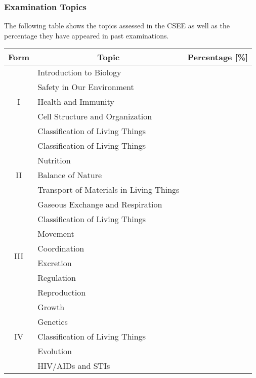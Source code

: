 \subsubsection{Examination Topics}
\noindent The following table shows the topics assessed in the CSEE as well as the percentage they have appeared in past examinations. 
\begin{center}
	\begin{tabular}{|c|l|c|} \hline
		Form & \multicolumn{1}{|c|}{Topic} & Percentage [\%] \\ \hline
		\multirow{5}{*}{I} 	& Introduction to Biology					& \\ \cline{2-3}
						& Safety in Our Environment				& \\ \cline{2-3}
						& Health and Immunity					& \\ \cline{2-3}
						& Cell Structure and Organization			& \\ \cline{2-3}
						& Classification of Living Things			& \\ \hline
		\multirow{5}{*}{II} 	& Classification of Living Things			& \\ \cline{2-3}
						& Nutrition						 		& \\ \cline{2-3}
						& Balance of Nature						& \\ \cline{2-3}
						& Transport of Materials in Living Things		& \\ \cline{2-3}
						& Gaseous Exchange and Respiration		& \\ \hline
		\multirow{6}{*}{III}	& Classification of Living Things 			& \\ \cline{2-3}
						& Movement 							& \\ \cline{2-3}
						& Coordination 							& \\ \cline{2-3}
						& Excretion							& \\ \cline{2-3}
						& Regulation							& \\ \cline{2-3}
						& Reproduction							& \\ \hline
		\multirow{5}{*}{IV}	& Growth								& \\ \cline{2-3}
						& Genetics 							& \\ \cline{2-3}
						& Classification of Living Things			& \\ \cline{2-3}
						& Evolution							& \\ \cline{2-3}
						& HIV/AIDs and STIs						& \\ \hline
	\end{tabular}
\end{center}
